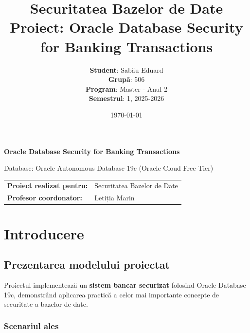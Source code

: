 \documentclass[12pt,a4paper]{article}
\title{
    \textbf{Securitatea Bazelor de Date} \\
    \large Proiect: Oracle Database Security for Banking Transactions
}
\author{
    \textbf{Student}: Sabău Eduard \\
    \textbf{Grupă}: 506 \\
    \textbf{Program}: Master - Anul 2 \\
    \textbf{Semestrul}: 1, 2025-2026
}
\date{\today}
\begin{document}
\maketitle
\thispagestyle{empty}

\vspace{2cm}

\begin{center}
\textbf{\Large Oracle Database Security for Banking Transactions}

\vspace{1cm}

Database: Oracle Autonomous Database 19c (Oracle Cloud Free Tier)

\vspace{2cm}

\begin{tabular}{ll}
\textbf{Proiect realizat pentru:} & Securitatea Bazelor de Date \\
\textbf{Profesor coordonator:} & Letiția Marin \\
\end{tabular}
\end{center}

\newpage

\tableofcontents
\newpage

\section{Introducere}

\subsection{Prezentarea modelului proiectat}

Proiectul implementează un \textbf{sistem bancar securizat} folosind Oracle Database 19c, demonstrând aplicarea practică a celor mai importante concepte de securitate a bazelor de date.

\subsubsection{Scenariul ales}
\end{document}
